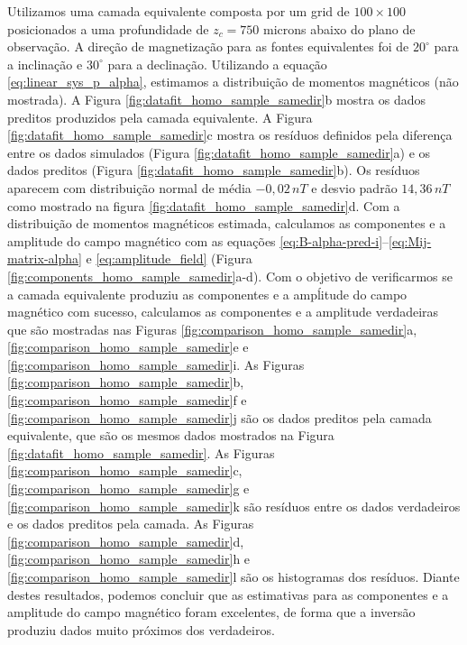 Utilizamos uma camada equivalente composta por um grid de $100 \times 100$ posicionados a uma profundidade de $z_c = 750$ microns abaixo do plano de observação. A direção de magnetização para as fontes equivalentes foi de $20^\circ$ para a inclinação e $30^\circ$ para a declinação. Utilizando a equação \ref{eq:linear_sys_p_alpha}, estimamos a distribuição de momentos magnéticos (não mostrada). A Figura \ref{fig:datafit_homo_sample_samedir}b mostra os dados preditos produzidos pela camada equivalente. A Figura \ref{fig:datafit_homo_sample_samedir}c mostra os resíduos definidos pela diferença entre os dados simulados (Figura \ref{fig:datafit_homo_sample_samedir}a) e os dados preditos (Figura \ref{fig:datafit_homo_sample_samedir}b). Os resíduos aparecem com distribuição normal de média $-0,02 \, nT$ e desvio padrão $14,36 \, nT$ como mostrado na figura \ref{fig:datafit_homo_sample_samedir}d. Com a distribuição de momentos magnéticos estimada, calculamos as componentes e a amplitude do campo magnético com as equações \ref{eq:B-alpha-pred-i}--\ref{eq:Mij-matrix-alpha} e \ref{eq:amplitude_field} (Figura \ref{fig:components_homo_sample_samedir}a-d). Com o objetivo de verificarmos se a camada equivalente produziu as componentes e a ampĺitude do campo magnético com sucesso, calculamos as componentes e a amplitude verdadeiras que são mostradas nas Figuras \ref{fig:comparison_homo_sample_samedir}a, \ref{fig:comparison_homo_sample_samedir}e e \ref{fig:comparison_homo_sample_samedir}i. As Figuras \ref{fig:comparison_homo_sample_samedir}b, \ref{fig:comparison_homo_sample_samedir}f e \ref{fig:comparison_homo_sample_samedir}j são os dados preditos pela camada equivalente, que são os mesmos dados mostrados na Figura \ref{fig:datafit_homo_sample_samedir}.
As Figuras \ref{fig:comparison_homo_sample_samedir}c, \ref{fig:comparison_homo_sample_samedir}g e \ref{fig:comparison_homo_sample_samedir}k são resíduos entre os dados verdadeiros e os dados preditos pela camada. As Figuras \ref{fig:comparison_homo_sample_samedir}d, \ref{fig:comparison_homo_sample_samedir}h e \ref{fig:comparison_homo_sample_samedir}l são os histogramas dos resíduos. Diante destes resultados, podemos concluir que as estimativas para as componentes e a amplitude do campo magnético foram excelentes, de forma que a inversão produziu dados muito próximos dos verdadeiros.  

